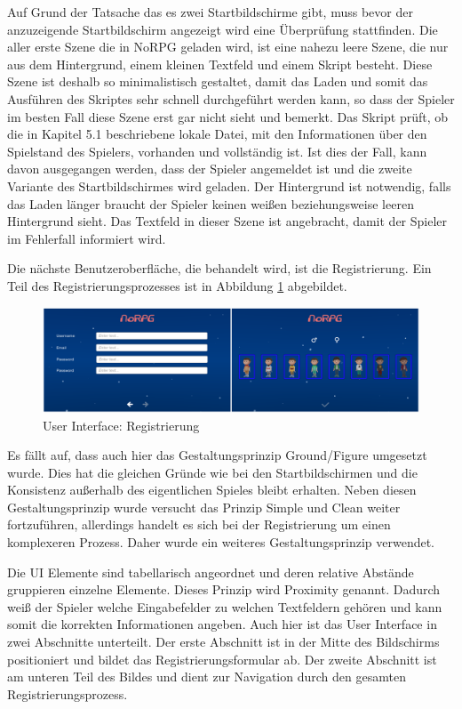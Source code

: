 				Auf Grund der Tatsache das es zwei Startbildschirme gibt, muss bevor der anzuzeigende Startbildschirm angezeigt wird eine Überprüfung stattfinden. Die aller erste Szene die in NoRPG geladen wird, ist eine nahezu leere Szene, die nur aus dem Hintergrund, einem kleinen Textfeld und einem Skript besteht. Diese Szene ist deshalb so minimalistisch gestaltet, damit das Laden und somit das Ausführen des Skriptes sehr schnell durchgeführt werden kann, so dass der Spieler im besten Fall diese Szene erst gar nicht sieht und bemerkt. Das Skript prüft, ob die in Kapitel 5.1 beschriebene lokale Datei, mit den Informationen über den Spielstand des Spielers, vorhanden und vollständig ist. Ist dies der Fall, kann davon ausgegangen werden, dass der Spieler angemeldet ist und die zweite Variante des Startbildschirmes wird geladen. Der Hintergrund ist notwendig, falls das Laden länger braucht der Spieler keinen weißen beziehungsweise leeren Hintergrund sieht. Das Textfeld in dieser Szene ist angebracht, damit der Spieler im Fehlerfall informiert wird.

				Die nächste Benutzeroberfläche, die behandelt wird, ist die Registrierung. Ein Teil des Registrierungsprozesses ist in Abbildung \ref{registerUI} abgebildet.

				\begin{figure}[htbp]
					\centering 
					\label{registerUI}
					\includegraphics[width=\textwidth]{pics/registerScreen.png}
					\caption{User Interface: Registrierung}
				\end{figure}

				Es fällt auf, dass auch hier das Gestaltungsprinzip Ground/Figure umgesetzt wurde. Dies hat die gleichen Gründe wie bei den Startbildschirmen und die Konsistenz außerhalb des eigentlichen Spieles bleibt erhalten. Neben diesen Gestaltungsprinzip wurde versucht das Prinzip Simple und Clean weiter fortzuführen, allerdings handelt es sich bei der Registrierung um einen komplexeren Prozess. Daher wurde ein weiteres Gestaltungsprinzip verwendet. 
				
				Die \ac{UI} Elemente sind tabellarisch angeordnet und deren relative Abstände gruppieren einzelne Elemente. Dieses Prinzip wird Proximity genannt. Dadurch weiß der Spieler welche Eingabefelder zu welchen Textfeldern gehören und kann somit die korrekten Informationen angeben. Auch hier ist das User Interface in zwei Abschnitte unterteilt. Der erste Abschnitt ist in der Mitte des Bildschirms positioniert und bildet das Registrierungsformular ab. Der zweite Abschnitt ist am unteren Teil des Bildes und dient zur Navigation durch den gesamten Registrierungsprozess.

